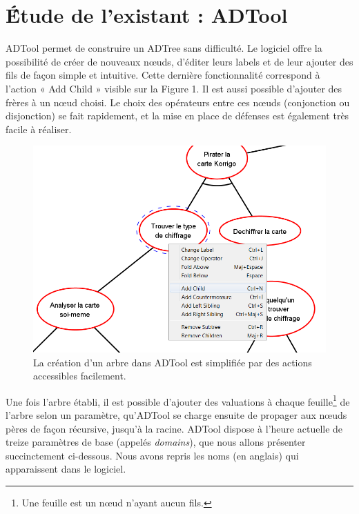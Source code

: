 \section{\'Étude de l'existant : ADTool}
	\label{sec:adtool}


	ADTool permet de construire un ADTree sans difficulté. Le logiciel offre la possibilité de créer de nouveaux nœuds, d'éditer leurs labels et de leur ajouter des fils de façon simple et intuitive. Cette dernière fonctionnalité correspond à l'action « Add Child » visible sur la Figure 1. Il est aussi possible d'ajouter des frères à un nœud choisi. Le choix des opérateurs entre ces nœuds (conjonction ou disjonction)  se fait rapidement, et la mise en place de défenses est également très facile à réaliser. 
	
	\begin{figure}[h]
        \centering
        \includegraphics[width=1\textwidth]{figure/adtool_add_child.png}
        \caption{La création d'un arbre dans ADTool est simplifiée par des actions accessibles facilement.}
        \label{fig:arbre_exemple_1}
    \end{figure}
	
	Une fois l'arbre établi, il est possible d'ajouter des valuations à chaque feuille\footnote{Une feuille est un nœud n'ayant aucun fils.} de l'arbre selon un paramètre, qu'ADTool se charge ensuite de propager aux nœuds pères de façon récursive, jusqu'à la racine. ADTool dispose à l'heure actuelle de treize paramètres de base (appelés \textit{domains}), que nous allons présenter succinctement ci-dessous. Nous avons repris les noms (en anglais) qui apparaissent dans le logiciel. 
					
